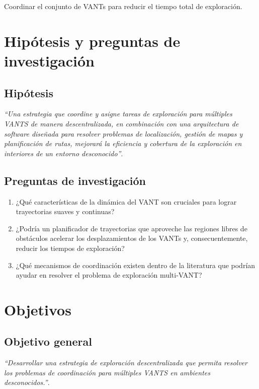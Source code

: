 Coordinar el conjunto de VANTs para reducir el tiempo total de exploración.
  
  
\section{Hipótesis y preguntas de investigación}

\subsection*{Hipótesis}
\emph{``Una estrategia que coordine y asigne tareas de exploración para múltiples VANTS de manera descentralizada, en combinación con una arquitectura de software diseñada para resolver problemas de localización, gestión de mapas y planificación de rutas, mejorará la eficiencia y cobertura de la exploración en interiores de un entorno desconocido''}.


\subsection*{Preguntas de investigación}

\begin{enumerate}\setlength{\itemsep}{-1mm}
\item ¿Qué características de la dinámica del VANT son cruciales para lograr trayectorias suaves y continuas?
\item ¿Podría un planificador de trayectorias que aproveche las regiones libres de obstáculos acelerar los desplazamientos de los VANTs y, consecuentemente, reducir los tiempos de exploración?
\item ¿Qué mecanismos de coordinación existen dentro de la literatura que podrían ayudar en resolver el problema de exploración multi-VANT?
\end{enumerate}

\section{Objetivos}

\subsection*{Objetivo general}

\emph{``Desarrollar una estrategia de exploración descentralizada que permita resolver los problemas de coordinación para múltiples VANTS en ambientes desconocidos.''}.

